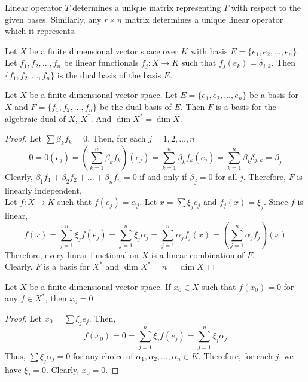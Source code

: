 \begin{important}
	Linear operator $T$ determines a unique matrix representing $T$ with respect to the given bases.
	Similarly, any $r \times n$ matrix determines a unique linear operator which it represents.
\end{important}

\begin{definition}
	Let $X$ be a finite dimensional vector space over $K$ with basis $E = \{e_1,e_2,\dots,e_n\}$.
	Let $f_1,f_2,\dots,f_n$ be linear functionals $f_j : X \to K$ such that $f_j(e_k) = \delta_{j,k}$.
	Then $\{f_1,f_2,\dots,f_n\}$ is the dual basis of the basis $E$.
\end{definition}

\begin{theorem}
	Let $X$ be a finite dimensional vector space.
	Let $E = \{ e_1,e_2,\dots,e_n \}$ be a basis for $X$ and $F = \{ f_1,f_2,\dots,f_n \}$ be the dual basis of $E$.
	Then $F$ is a basis for the algebraic dual of $X$, $X^\ast$.
	And $\dim X^\ast = \dim X$.
\end{theorem}
\begin{proof}
	Let $\sum \beta_k f_k = 0$.
	Then, for each $j = 1,2,\dots,n $
	\[ 0 = 0(e_j) = \left( \sum_{k = 1}^n \beta_k f_k\right)(e_j) =\sum_{k = 1}^n \beta_k f_k(e_j) =\sum_{k = 1}^n \beta_k \delta_{j,k} = \beta_j \]
	Clearly, $\beta_1f_1+\beta_2f_2+\dots+\beta_nf_n = 0$ if and only if $\beta_j = 0$ for all $j$.
	Therefore, $F$ is linearly independent.\\

	Let $f : X \to K$ such that $f(e_j) = \alpha_j$.
	Let $x = \sum \xi_j e_j$ and $f_j(x) = \xi_j$.
	Since $f$ is linear, 
	\[ f(x) = \sum_{j=1}^n \xi_j f(e_j) = \sum_{j=1}^n \xi_j \alpha_j = \sum_{j=1}^n \alpha_j f_j(x) = \left( \sum_{j=1}^n \alpha_j f_j \right) (x) \]
	Therefore, every linear functional on $X$ is a linear combination of $F$.\\
	Clearly, $F$ is a basis for $X^\ast$ and $\dim X^\ast = n = \dim X$
\end{proof}

\begin{lemma}
	Let $X$ be a finite dimensional vector space.
	If $x_0 \in X$ such that $f(x_0) = 0$ for any $f \in X^\ast$, then $x_0 = 0$.
\end{lemma}
\begin{proof}
	Let $x_0 = \sum \xi_j e_j$.
	Then,
	\[ f(x_0) = 0 = \sum_{j=1}^n \xi_j f(e_j) = \sum_{j=1}^n \xi_j \alpha_j \]
	Thus, $\sum \xi_j \alpha_j = 0$ for any choice of $\alpha_1,\alpha_2,\dots,\alpha_n \in K$.
	Therefore, for each $j$, we have $\xi_j = 0$.
	Clearly, $x_0 = 0$.
\end{proof}

